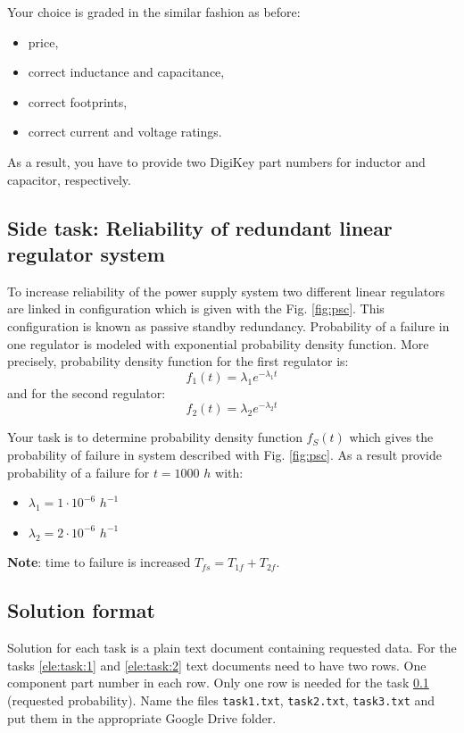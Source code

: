 \documentclass[a4paper]{article}
\begin{document}
Your choice is graded in the similar fashion as before:
\begin{itemize}
\item price,
\item correct inductance and capacitance,
\item correct footprints, 
\item correct current and voltage ratings.
\end{itemize}
As a result, you have to provide two DigiKey part numbers for inductor and 
capacitor, respectively. 

\subsection{Side task: Reliability of redundant linear regulator system}
\label{ele:task:3}
To increase reliability of the power supply system two different linear 
regulators are linked in configuration which is given with the Fig. 
\ref{fig:psc}. This configuration is known as passive standby redundancy. 
Probability of a failure in one regulator is modeled with exponential 
probability density function. More precisely, probability density function for 
the first regulator is:  
\begin{equation}
f_1(t) = \lambda_1 e^{-\lambda_1 t}
\end{equation}
and for the second regulator:
\begin{equation}
f_2(t) = \lambda_2 e^{-\lambda_2 t}
\end{equation}

Your task is to determine probability density function $f_S(t)$ which gives the
probability of failure in system described with Fig. \ref{fig:psc}. As a result 
provide probability of a failure for $t = 1000$ $h$ with:
\begin{itemize}
\item[] $\lambda_1 = 1 \cdot10^{-6}$ $h^{-1}$
\item[] $\lambda_2 = 2 \cdot10^{-6}$ $h^{-1}$ 
\end{itemize} 

\textbf{Note}: time to failure is increased $T_{fs} = T_{1f} + T_{2f}$. 

\subsection{Solution format}
Solution for each task is a plain text document containing requested data. For
the tasks \ref{ele:task:1} and \ref{ele:task:2} text documents need to have 
two rows. One component part number in each row. Only one row is needed for the 
task \ref{ele:task:3} (requested probability). Name the files 
\texttt{task1.txt}, \texttt{task2.txt}, \texttt{task3.txt} and put them in 
the appropriate Google Drive folder.
\end{document}
